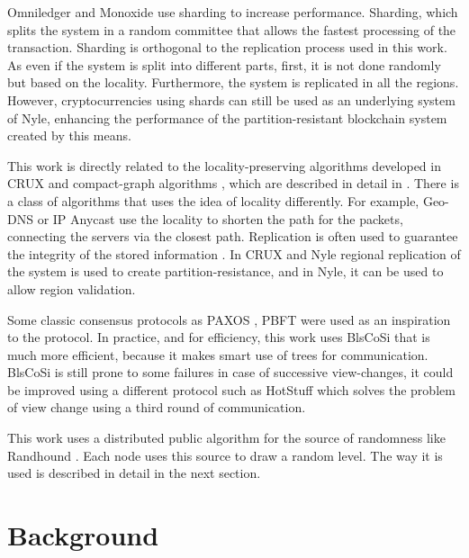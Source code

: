 \documentclass[a4paper,11pt,twoside,openright]{report}
\begin{document}
Omniledger \cite{Kokoris-Kogias2017} and Monoxide \cite{Wang2019} use sharding
to increase performance. Sharding, which splits the system in a random committee that
allows the fastest processing of the transaction. Sharding is orthogonal to the replication process used in this work. As even if the system is split into different parts,
first, it is not done randomly but based on the locality. Furthermore, the system is replicated
in all the regions. However, cryptocurrencies using shards can still be used as
an underlying system of Nyle, enhancing the performance of the
partition-resistant blockchain system created by this means.

This work is directly related to the locality-preserving algorithms developed
in CRUX \cite{Basescu2014} and compact-graph algorithms \cite{Thorup2005}, which are described in detail in . There is a class of
algorithms that uses the idea of locality differently. For example, Geo-DNS
\cite{Katz-bassett2006} or IP Anycast \cite{Abley2006} use the locality to
shorten the path for the packets, connecting the servers via the closest path.
Replication is often used to guarantee the integrity of the stored information
\cite{Mokadem2015}. In CRUX \cite{Basescu2014} and Nyle regional replication of
the system is used to create partition-resistance, and in Nyle, it can be used
to allow region validation.

Some classic consensus protocols as PAXOS \cite{Lamport2000}, PBFT
\cite{Castro1999} were used as an inspiration to the protocol. In practice, and
for efficiency, this work uses BlsCoSi \cite{Boneh2018} that is much more
efficient, because it makes smart use of trees for communication. BlsCoSi
\cite{Boneh2018} is still prone to some failures in case of successive
view-changes, it could be improved using a different protocol such as HotStuff
\cite{Yin2018} which solves the problem of view change using a third round of
communication. 

This work uses a distributed public algorithm for the source of randomness like
Randhound \cite{Syta2016}. Each node uses this source to draw a random
level. The way it is used is described in detail in the next section. 


\chapter{Background} \label{chap:Background} %
\end{document}
